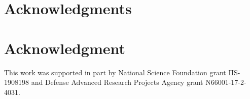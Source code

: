 \documentclass[10pt,journal,compsoc]{IEEEtran}
\begin{document}
\ifCLASSOPTIONcompsoc
  \section*{Acknowledgments}
\else
  \section*{Acknowledgment}
\fi


This work was supported in part by National Science Foundation grant IIS-1908198 and Defense Advanced Research Projects Agency grant N66001-17-2-4031.


\ifCLASSOPTIONcaptionsoff
  \newpage
\fi







%





%
\end{document}
